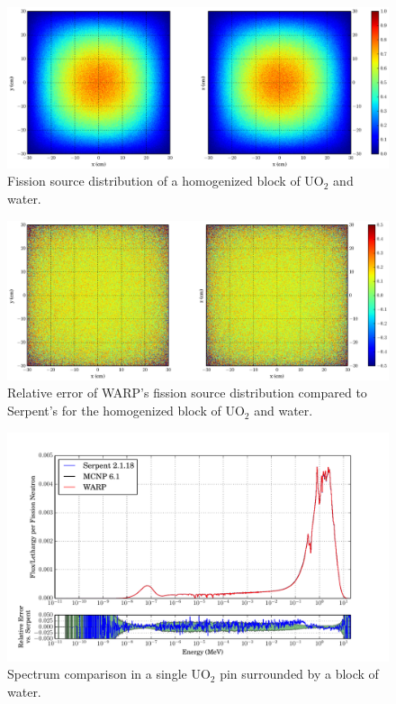 \begin{figure}[h!]
\centering
\includegraphics[width=\textwidth,trim= 5cm 0cm 7cm 0cm]{graphics/finalresults/homfuel_fiss-6.eps}
\caption{Fission source distribution of a homogenized block of UO$_2$ and water. \label{homfuel_fiss} }
\end{figure}

\begin{figure}[h!]
\centering
\includegraphics[width=\textwidth,trim= 5cm 0cm 7cm 0cm]{graphics/finalresults/homfuel_fiss_diff-6.eps}
\caption{Relative error of WARP's fission source distribution compared to Serpent's for the homogenized block of UO$_2$ and water. \label{homfuel_fiss_diff} }
\end{figure}

\begin{figure}[h!] 
\centering
\includegraphics[width=\textwidth,trim= 1cm 0cm 1cm 0cm]{graphics/finalresults/pincell_spec-6.pdf}
\caption{Spectrum comparison in a single UO$_2$ pin surrounded by a block of water. \label{pincell_spec} }
\end{figure}

